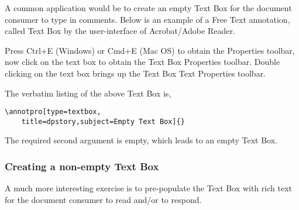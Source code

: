 \documentclass[12pt]{article}
\let\app\textsf
\let\uif\textsf
\begin{document}
A common application would be to create an empty \uif{Text Box} for the
document consumer to type in comments. Below is an example of a \uif{Free
Text} annotation, called \uif{Text Box} by the user-interface of
\app{Acrobat}/\app{Adobe Reader}.
\begin{flushleft} %
\begin{minipage}{2in}
\annotpro[title=dpstory,type=textbox,subject=Empty Text Box]{}
\end{minipage}\hfill
\begin{minipage}{\linewidth-2in-10pt}\small
Press \uif{Ctrl+E} (\app{Windows}) or \uif{Cmd+E} (\app{Mac OS}) to obtain
the \uif{Properties} toolbar, now click on the text box  to obtain the
\uif{Text Box Properties} toolbar. Double clicking on the text box
brings up the \uif{Text Box Text Properties} toolbar.
\end{minipage}
\end{flushleft}
The verbatim listing of the above \uif{Text Box} is,
\begin{Verbatim}[xleftmargin=\leftmargini]
\annotpro[type=textbox,
    title=dpstory,subject=Empty Text Box]{}
\end{Verbatim}
The required second argument is empty, which leads to an empty \uif{Text Box}.

\subsubsection{Creating a non-empty \texorpdfstring{\protect\uif{Text Box}}{Text Box}}

A much more interesting exercise is to pre-populate the \uif{Text Box} with rich text for the
document consumer to read and/or to respond.
\end{document}
